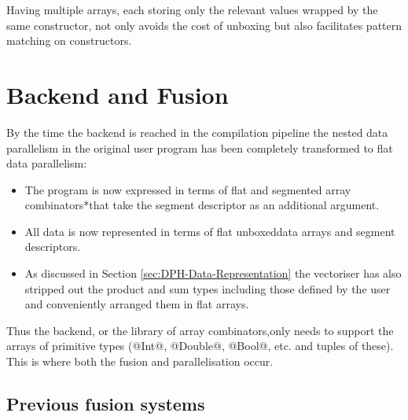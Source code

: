 \documentclass[preamble.tex]{subfiles}
\begin{document}
Having multiple arrays, each storing only the relevant values wrapped by the same constructor, not only avoids the cost of unboxing but also facilitates pattern matching on constructors.


\clearpage

\section{Backend and Fusion}

By the time the backend is reached in the compilation pipeline the nested data parallelism in the original user program has been completely transformed to flat data parallelism:
\begin{itemize}
\item The program is now expressed in terms of flat and \*segmented array combinators*\isegcomb that take the segment descriptor as an additional argument.
\item All data is now represented in terms of flat unboxed\iboxing data arrays and segment descriptors.\isegd
\item As discussed in Section \ref{sec:DPH-Data-Representation} the vectoriser has also stripped out the product and sum types including those defined by the user and conveniently arranged them in flat arrays.
\end{itemize}

Thus the backend, or the library of array combinators,\icomb only needs to support the arrays of primitive types (@Int@, @Double@, @Bool@, etc. and tuples of these). This is where both the fusion and parallelisation occur.



\subsection{Previous fusion systems}
\label{sec:DPH-fusion-levels}
\end{document}
